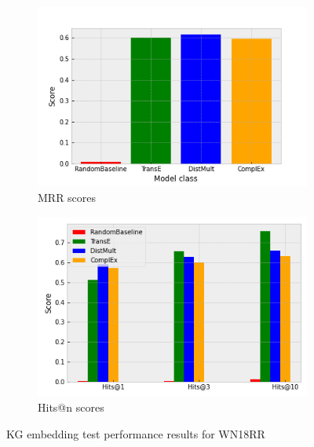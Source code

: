 \begin{figure}[h]
\centering
\begin{subfigure}{.5\textwidth}
  \centering
  \includegraphics[width=1\linewidth]{figures/model_selection/wn18rr_mrr.png}
  \caption{MRR scores}
  \label{fig:sub1}
\end{subfigure}%
\begin{subfigure}{.5\textwidth}
  \centering
  \includegraphics[width=1\linewidth]{figures/model_selection/wn18rr_hit_scores.png}
  \caption{Hits@n scores}
  \label{fig:sub2}
\end{subfigure}
\caption{KG embedding test performance results for WN18RR}
\label{fig:test}
\end{figure}




